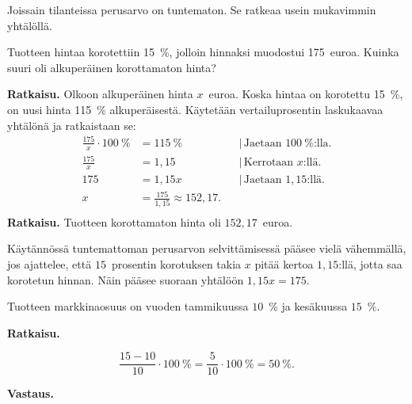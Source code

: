 Joissain tilanteissa perusarvo on tuntematon. Se ratkeaa usein mukavimmin yhtälöllä.

\begin{esimerkki}
Tuotteen hintaa korotettiin 15~\%, jolloin hinnaksi muodostui 175~euroa. Kuinka suuri oli alkuperäinen korottamaton hinta?

\textbf{Ratkaisu.} 
Olkoon alkuperäinen hinta $x$~euroa. Koska hintaa on korotettu 15~\%, on uusi hinta 115~\% alkuperäisestä. Käytetään vertailuprosentin laskukaavaa yhtälönä ja ratkaistaan se:
\begin{align*}
	\frac{175}{x} \cdot 100~\%	&= 115~\%	&	&|\, \text{Jaetaan $100~\%$:lla.} \\
	\frac{175}{x}	&= 1,15	&	&|\, \text{Kerrotaan $x$:llä.} \\
	175	&= 1,15x	&	&|\, \text{Jaetaan $1,15$:llä.} \\
	x	&= \frac{175}{1,15} \approx 152,17.	&	& \\
\end{align*}
    \textbf{Ratkaisu.}
    Tuotteen korottamaton hinta oli $152,17$~euroa.
\end{esimerkki}

Käytännössä tuntemattoman perusarvon selvittämisessä pääsee vielä vähemmällä, jos ajattelee, että $15$~prosentin korotuksen takia $x$ pitää kertoa $1,15$:llä, jotta saa korotetun hinnan. Näin pääsee suoraan yhtälöön $1,15x = 175$.



\begin{esimerkki}
    Tuotteen markkinaosuus on vuoden tammikuussa $10$~\% ja kesäkuussa $15$~\%.
    \begin{alakohdat}
    \end{alakohdat}
    
    \textbf{Ratkaisu.}
    
    \begin{alakohdat}
            \[
                \frac{15-10}{10} \cdot 100~\%= \frac{5}{10}\cdot 100~\% = 50~\%.
            \]
        
    \end{alakohdat}
    
    \textbf{Vastaus.}
    
    \begin{alakohdat}
    \end{alakohdat}
\end{esimerkki}

